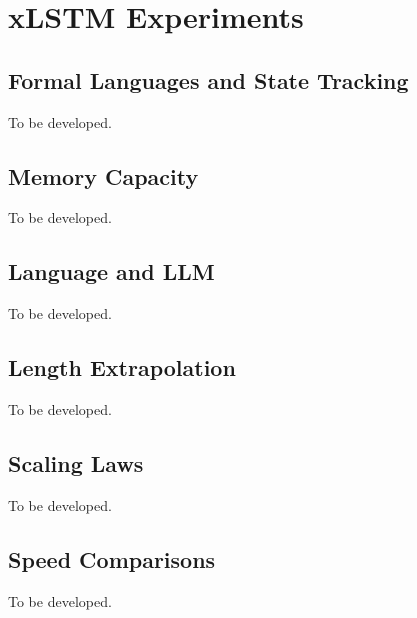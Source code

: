 \documentclass[11pt, oneside]{book}
\let\originalsection\section
\renewcommand{\section}{\Needspace{7\baselineskip}\originalsection}
\let\originalsubsection\subsection
\renewcommand{\subsection}{\Needspace{6\baselineskip}\originalsubsection}
\begin{document}
\section{xLSTM Experiments}\label{sec:source-8-3}

\subsection{Formal Languages and State Tracking}\label{sec:source-8-3-1}
{\small\color{gray!70!black} To be developed.}

\subsection{Memory Capacity}\label{sec:source-8-3-2}
{\small\color{gray!70!black} To be developed.}

\subsection{Language and LLM}\label{sec:source-8-3-3}
{\small\color{gray!70!black} To be developed.}

\subsection{Length Extrapolation}\label{sec:source-8-3-4}
{\small\color{gray!70!black} To be developed.}

\subsection{Scaling Laws}\label{sec:source-8-3-5}
{\small\color{gray!70!black} To be developed.}

\subsection{Speed Comparisons}\label{sec:source-8-3-6}
{\small\color{gray!70!black} To be developed.}
\end{document}

